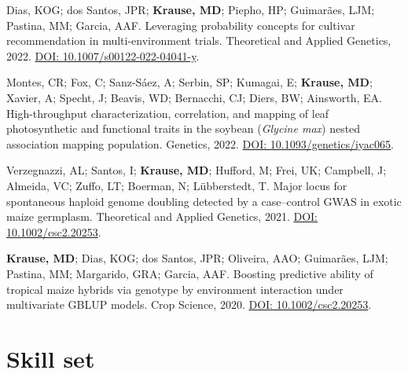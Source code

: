 \documentclass[]{mdkrause_cv_openfont}
\begin{document}
\begin{minipage}[t]{1\textwidth} 


\sectionsep
Dias, KOG; dos Santos, JPR; \textbf{Krause, MD}; Piepho, HP; Guimarães, LJM; Pastina, MM; Garcia, AAF. Leveraging probability concepts for cultivar recommendation in multi-environment trials. Theoretical and Applied Genetics, 2022. \href{https://link.springer.com/article/10.1007/s00122-022-04041-y}{DOI: 10.1007/s00122-022-04041-y}. \ExternalLink 

\sectionsep
Montes, CR; Fox, C; Sanz-Sáez, A; Serbin, SP; Kumagai, E; \textbf{Krause, MD}; Xavier, A; Specht, J; Beavis, WD; Bernacchi, CJ; Diers, BW; Ainsworth, EA. High-throughput characterization, correlation, and mapping of leaf photosynthetic and functional traits in the soybean (\textit{Glycine max}) nested association mapping population. Genetics, 2022. \href{https://academic.oup.com/genetics/advance-article/doi/10.1093/genetics/iyac065/6572345?login=true}{DOI: 10.1093/genetics/iyac065}. \ExternalLink

\sectionsep
Verzegnazzi, AL; Santos, I; \textbf{Krause, MD}; Hufford, M; Frei, UK; Campbell, J; Almeida, VC; Zuffo, LT; Boerman, N; Lübberstedt, T. Major locus for spontaneous haploid genome doubling detected by a case–control GWAS in exotic maize germplasm. Theoretical and Applied Genetics, 2021. \href{https://link.springer.com/article/10.1007/s00122-021-03780-8}{DOI: 10.1002/csc2.20253}. \ExternalLink 

\sectionsep
\textbf{Krause, MD}; Dias, KOG; dos Santos, JPR; Oliveira, AAO; Guimarães, LJM; Pastina, MM; Margarido, GRA; Garcia, AAF. Boosting predictive ability of tropical maize hybrids via genotype by environment interaction under multivariate GBLUP models. Crop Science, 2020. \href{https://acsess.onlinelibrary.wiley.com/doi/full/10.1002/csc2.20253}{DOI: 10.1002/csc2.20253}. \ExternalLink 

\sectionsep


\section{Skill set}

\sectionsep


\end{minipage}
\end{document}

